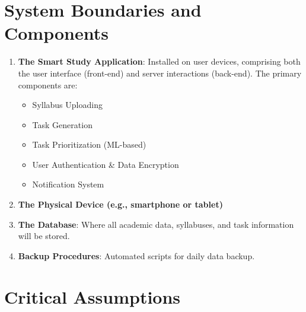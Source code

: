 \documentclass{article}
\begin{document}
\section{System Boundaries and Components}
\begin{enumerate}
    \item \textbf{The Smart Study Application}: Installed on user devices, comprising both the user interface (front-end) and server interactions (back-end). The primary components are:
    \begin{itemize}
        \item Syllabus Uploading
        \item Task Generation
        \item Task Prioritization (ML-based)
        \item User Authentication \& Data Encryption
        \item Notification System
    \end{itemize}
    
    \item \textbf{The Physical Device (e.g., smartphone or tablet)}
    \item \textbf{The Database}: Where all academic data, syllabuses, and task information will be stored.
    \item \textbf{Backup Procedures}: Automated scripts for daily data backup.
\end{enumerate}

\section{Critical Assumptions}
\end{document}
